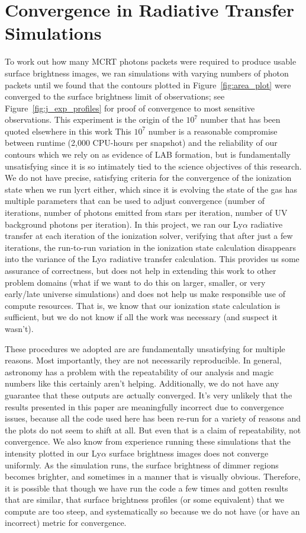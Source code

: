 \section{Convergence in Radiative Transfer Simulations}
To work out how many MCRT photons packets were required to produce usable surface brightness images, we ran simulations with varying numbers of photon packets until we found that the contours plotted in Figure~\ref{fig:area_plot} were converged to the surface brightness limit of observations; see Figure~\ref{fig:j_exp_profiles} for proof of convergence to most sensitive observations.
This experiment is the origin of the $10^7$ number that has been quoted elsewhere in this work
This $10^7$ number is a reasonable compromise between runtime (2,000 CPU-hours per snapshot) and the reliability of our contours which we rely on as evidence of LAB formation, but is fundamentally unsatisfying since it is so intimately tied to the science objectives of this research.
We do not have precise, satisfying criteria for the convergence of the ionization state when we run {\sc lycrt} either, which since it is evolving the state of the gas has multiple parameters that can be used to adjust convergence (number of iterations, number of photons emitted from stars per iteration, number of UV background photons per iteration).
In this project, we ran our Ly$\alpha$ radiative transfer at each iteration of the ionization solver, verifying that after just a few iterations, the run-to-run variation in the ionization state calculation disappears into the variance of the Ly$\alpha$ radiative transfer calculation.
This provides us some assurance of correctness, but does not help in extending this work to other problem domains (what if we want to do this on larger, smaller, or very early/late universe simulations) and does not help us make responsible use of compute resources.
That is, we know that our ionization state calculation is sufficient, but we do not know if all the work was necessary (and suspect it wasn't).

These procedures we adopted are are fundamentally unsatisfying for multiple reasons.
Most importantly, they are not necessarily reproducible.
In general, astronomy has a problem with the repeatability of our analysis and magic numbers like this certainly aren't helping.
Additionally, we do not have any guarantee that these outputs are {\emph actually} converged.
It's very unlikely that the results presented in this paper are meaningfully incorrect due to convergence issues, because all the code used here has been re-run for a variety of reasons and the plots do not seem to shift at all.
But even that is a claim of repeatability, not convergence.
We also know from experience running these simulations that the intensity plotted in our Ly$\alpha$ surface brightness images does not converge uniformly.
As the simulation runs, the surface brightness of dimmer regions becomes brighter, and sometimes in a manner that is visually obvious.
Therefore, it is possible that though we have run the code a few times and gotten results that are similar, that surface brightness profiles (or some equivalent) that we compute are too steep, and systematically so because we do not have (or have an incorrect) metric for convergence.


